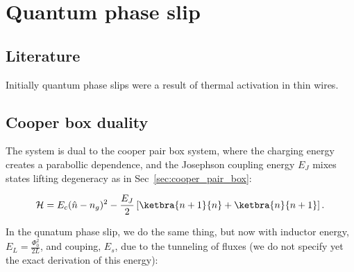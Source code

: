 \newpage

\section{Quantum phase slip \cite{mooij2005} \label{sec:qps}}

\subsection{Literature}

Initially quantum phase slips were a result of thermal activation in thin wires.

\subsection{Cooper box duality}
 The system is dual to the cooper pair box system, where the charging energy creates a parabollic dependence, and the Josephson coupling energy $ E_J $ mixes states lifting degeneracy as in Sec~\ref{sec:cooper_pair_box}:
 
 \begin{equation}\label{key}
 	\mathcal{H} = E_c(\hat{n} - n_g)^2 - \frac{E_J}{2}\left[\ketbra{n+1}{n} + \ketbra{n}{n+1}\right].
 \end{equation}
 
 \noindent In the qunatum phase slip, we do the same thing, but now with inductor energy, $ E_L = \frac{\Phi_0^2}{2L} $, and couping, $ E_s $, due to the tunneling of fluxes (we do not specify yet the exact derivation of this energy):
 
